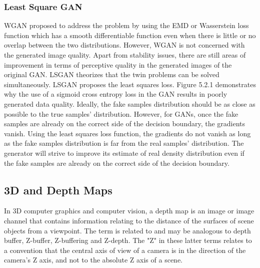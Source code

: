 \documentclass{article}
\begin{document}
\subsubsection{Least Square GAN}
WGAN proposed to address the problem by using the EMD or Wasserstein loss function which has a smooth differentiable function even when there is little
or no overlap between the two distributions. However, WGAN is not concerned
with the generated image quality. Apart from stability issues, there are still areas of
improvement in terms of perceptive quality in the generated images of the original
GAN. LSGAN theorizes that the twin problems can be solved simultaneously.
LSGAN proposes the least squares loss. Figure 5.2.1 demonstrates why the use of
a sigmoid cross entropy loss in the GAN results in poorly generated data quality.
Ideally, the fake samples distribution should be as close as possible to the true
samples' distribution. However, for GANs, once the fake samples are already
on the correct side of the decision boundary, the gradients vanish.
 Using the least
squares loss function, the gradients do not vanish as long as the fake samples
distribution is far from the real samples' distribution. The generator will strive
to improve its estimate of real density distribution even if the fake samples are
already on the correct side of the decision boundary.

\subsection{3D and Depth Maps}

In 3D computer graphics and computer vision, a depth map is an image or image channel that contains information relating to the distance of the surfaces of scene objects from a viewpoint. The term is related to and may be analogous to depth buffer, Z-buffer, Z-buffering and Z-depth. The "Z" in these latter terms relates to a convention that the central axis of view of a camera is in the direction of the camera's Z axis, and not to the absolute Z axis of a scene.
\end{document}
